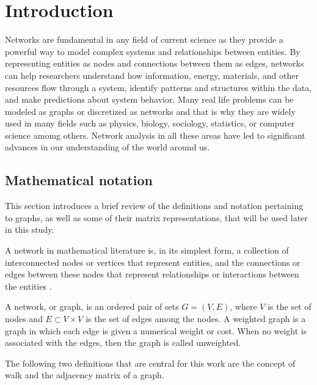 
\chapter[Introduction]{Introduction}
\label{chap:intro}

Networks are fundamental in any field of current science as they provide a powerful way to model complex systems and relationships between entities. By representing entities as nodes and connections between them as edges, networks can help researchers understand how information, energy, materials, and other resources flow through a system, identify patterns and structures within the data, and make predictions about system behavior. Many real life problems can be modeled as graphs or discretized as networks and that is why they are widely used in many fields such as physics, biology, sociology, statistics, or computer science amomg others. Network analysis in all these areas have led to significant advances in our understanding of the world around us.

\section{Mathematical notation}
\label{sec:graph}
This section introduces a brief review of the definitions and notation pertaining to graphs, as well as some of their matrix representations, that will be used later in this study.

A network in mathematical literature is, in its simplest form, a collection of interconnected nodes or vertices that represent entities, and the connections or edges between these nodes that represent relationships or interactions between the entities \cite{arrigo2022dynamic}.

\begin{definition}
    A network, or graph, is an ordered pair of sets $G = (V, E)$, where $V$ is the set of nodes and $E\subset V\times V$ is the set of edges among the nodes. A weighted graph is a graph in which each edge is given a numerical weight or cost. When no weight is associated with the edges, then the graph is called unweighted.
\end{definition}

The following two definitions that are central for this work are the concept of walk and the adjacency matrix of a graph.  

